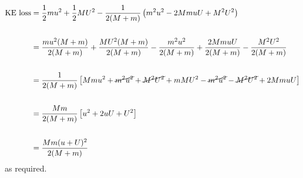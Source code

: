 \begin{hint}
{\begin{align*} \textrm{KE loss} &= \frac{1}{2}mu^{2} + \frac{1}{2}MU^{2} - \frac{1}{2(M + m)}\left(m^{2}u^{2} - 2MmuU + M^{2}U^{2}\right) \\ \\
	&= \frac{mu^{2}(M + m)}{2(M + m)} + \frac{MU^{2}(M + m)}{2(M + m)} - \frac{m^{2}u^{2}}{2(M + m)} + \frac{2MmuU}{2(M + m)} - \frac{M^{2}U^{2}}{2(M + m)} \\ \\
	&= \frac{1}{2(M + m)}\left[Mmu^{2} + \cancel{m^{2}u^{2}} + \cancel{M^{2}U^{2}} + mMU^{2} - \cancel{m^{2}u^{2}} - \cancel{M^{2}U^{2}} + 2MmuU\right] \\ \\
	&= \frac{Mm}{2(M + m)}\left[u^{2} + 2uU + U^{2}\right] \\ \\
	&= \frac{Mm(u + U)^{2}}{2(M + m)}
\end{align*} as required.
}
\end{hint}